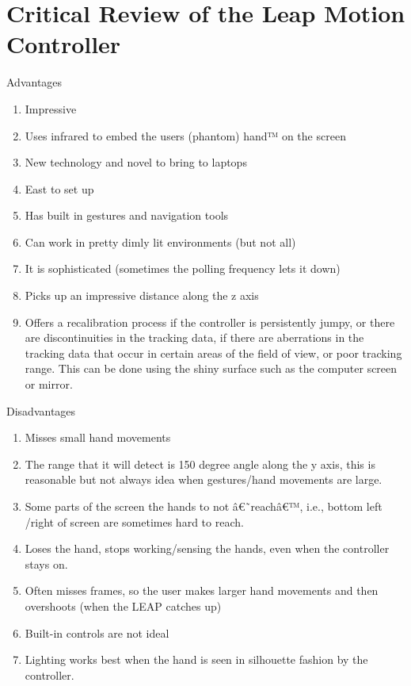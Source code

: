 \documentclass[a4paper, 11pt]{article}
\begin{document}
\section {Critical Review of the Leap Motion Controller}
Advantages
\begin{enumerate}
\item{Impressive}
\item{Uses infrared to embed the users (phantom) hand™ on the screen}
\item{New technology and novel to bring to laptops}
\item{East to set up}
\item{Has built in gestures and navigation tools}
\item{Can work in pretty dimly lit environments (but not all)}
\item{It is sophisticated (sometimes the polling frequency lets it down)}
\item{Picks up an impressive distance along the z axis}
\item{Offers a recalibration process if the controller is persistently jumpy, or there are discontinuities in the tracking data, if there are aberrations in the tracking data that occur in certain areas of the field of view, or poor tracking range. This can be done using the shiny surface such as the computer screen or mirror.}
\end{enumerate}	
Disadvantages
\begin{enumerate}
\item{Misses small hand movements}
\item{The range that it will detect is 150 degree angle along the y axis, this is reasonable but not always idea when gestures/hand movements are large.}
\item{Some parts of the screen the hands to not â€˜reachâ€™, i.e., bottom left /right of screen are sometimes hard to reach.}
\item{Loses the hand, stops working/sensing the hands, even when the controller stays on.}
\item{Often misses frames, so the user makes larger hand movements and then overshoots (when the LEAP catches up)}
\item{Built-in controls are not ideal}
\item{Lighting works best when the hand is seen in silhouette fashion by the controller. }
\end{enumerate}
\end{document}
